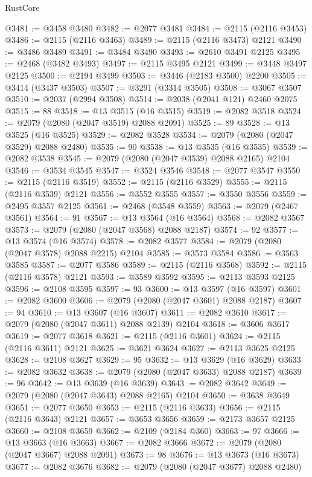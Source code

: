 \begin{lexlean}{RustCore}
\begin{coremodule}
@3481 := @3458 @3480
@3482 := @2077 @3481
@3484 := @2115 (@2116 @3453)
@3486 := @2115 (@2116 @3463)
@3489 := @2115 (@2116 @3473) @2121
@3490 := @3486 @3489
@3491 := @3484 @3490
@3493 := @2610 @3491 @2125
@3495 := @2468 (@3482 @3493)
@3497 := @2115 @3495 @2121
@3499 := @3448 @3497 @2125
@3500 := @2194 @3499
@3503 := @3446 (@2183 @3500) @2200
@3505 := @3414 (@3437 @3503)
@3507 := @3291 (@3314 @3505)
@3508 := @3067 @3507
@3510 := @2037 (@2994 @3508)
@3514 := @2038 (@2041 @121) @2460 @2075
@3515 := 88
@3518 := @13 @3515 (@16 @3515)
@3519 := @2082 @3518
@3524 := @2079 (@2080 (@2047 @3519) @2088 @2091)
@3525 := 89
@3528 := @13 @3525 (@16 @3525)
@3529 := @2082 @3528
@3534 := @2079 (@2080 (@2047 @3529) @2088 @2480)
@3535 := 90
@3538 := @13 @3535 (@16 @3535)
@3539 := @2082 @3538
@3545 := @2079 (@2080 (@2047 @3539) @2088 @2165) @2104
@3546 := @3534 @3545
@3547 := @3524 @3546
@3548 := @2077 @3547
@3550 := @2115 (@2116 @3519)
@3552 := @2115 (@2116 @3529)
@3555 := @2115 (@2116 @3539) @2121
@3556 := @3552 @3555
@3557 := @3550 @3556
@3559 := @2495 @3557 @2125
@3561 := @2468 (@3548 @3559)
@3563 := @2079 (@2467 @3561)
@3564 := 91
@3567 := @13 @3564 (@16 @3564)
@3568 := @2082 @3567
@3573 := @2079 (@2080 (@2047 @3568) @2088 @2187)
@3574 := 92
@3577 := @13 @3574 (@16 @3574)
@3578 := @2082 @3577
@3584 := @2079 (@2080 (@2047 @3578) @2088 @2215) @2104
@3585 := @3573 @3584
@3586 := @3563 @3585
@3587 := @2077 @3586
@3589 := @2115 (@2116 @3568)
@3592 := @2115 (@2116 @3578) @2121
@3593 := @3589 @3592
@3595 := @2113 @3593 @2125
@3596 := @2108 @3595
@3597 := 93
@3600 := @13 @3597 (@16 @3597)
@3601 := @2082 @3600
@3606 := @2079 (@2080 (@2047 @3601) @2088 @2187)
@3607 := 94
@3610 := @13 @3607 (@16 @3607)
@3611 := @2082 @3610
@3617 := @2079 (@2080 (@2047 @3611) @2088 @2139) @2104
@3618 := @3606 @3617
@3619 := @2077 @3618
@3621 := @2115 (@2116 @3601)
@3624 := @2115 (@2116 @3611) @2121
@3625 := @3621 @3624
@3627 := @2113 @3625 @2125
@3628 := @2108 @3627
@3629 := 95
@3632 := @13 @3629 (@16 @3629)
@3633 := @2082 @3632
@3638 := @2079 (@2080 (@2047 @3633) @2088 @2187)
@3639 := 96
@3642 := @13 @3639 (@16 @3639)
@3643 := @2082 @3642
@3649 := @2079 (@2080 (@2047 @3643) @2088 @2165) @2104
@3650 := @3638 @3649
@3651 := @2077 @3650
@3653 := @2115 (@2116 @3633)
@3656 := @2115 (@2116 @3643) @2121
@3657 := @3653 @3656
@3659 := @2173 @3657 @2125
@3660 := @2108 @3659
@3662 := @2109 (@2184 @360)
@3663 := 97
@3666 := @13 @3663 (@16 @3663)
@3667 := @2082 @3666
@3672 := @2079 (@2080 (@2047 @3667) @2088 @2091)
@3673 := 98
@3676 := @13 @3673 (@16 @3673)
@3677 := @2082 @3676
@3682 := @2079 (@2080 (@2047 @3677) @2088 @2480)

\end{coremodule}
\end{lexlean}
